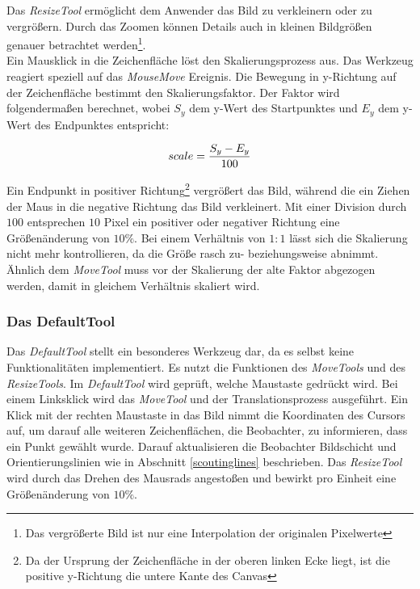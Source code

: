 Das \textit{ResizeTool} ermöglicht dem Anwender das Bild zu verkleinern oder zu vergrößern. Durch das Zoomen können Details auch in kleinen Bildgrößen genauer betrachtet werden\footnote{Das vergrößerte Bild ist nur eine Interpolation der originalen Pixelwerte}.\\
Ein Mausklick in die Zeichenfläche löst den Skalierungsprozess aus. Das Werkzeug reagiert speziell auf das \textit{MouseMove} Ereignis. Die Bewegung in y-Richtung auf der Zeichenfläche bestimmt den Skalierungsfaktor. Der Faktor wird folgendermaßen berechnet, wobei $S_y$ dem y-Wert des Startpunktes  und $E_y$ dem y-Wert des Endpunktes entspricht: 

\begin{equation}
scale = \frac{S_y - E_y}{100}
\vspace{0.5cm}
\end{equation}

Ein Endpunkt in positiver Richtung\footnote{Da der Ursprung der Zeichenfläche in der oberen linken Ecke liegt, ist die positive y-Richtung die untere Kante des Canvas} vergrößert das Bild, während die ein Ziehen der Maus in die negative Richtung das Bild verkleinert. Mit einer Division durch $100$ entsprechen $10$ Pixel ein positiver oder negativer Richtung eine Größenänderung von $10\%$. Bei einem Verhältnis von $1:1$ lässt sich die Skalierung nicht mehr kontrollieren, da die Größe rasch zu- beziehungsweise abnimmt.\\
Ähnlich dem \textit{MoveTool} muss vor der Skalierung der alte Faktor abgezogen werden, damit in gleichem Verhältnis skaliert wird.

\subsubsection{Das DefaultTool}

Das \textit{DefaultTool} stellt ein besonderes Werkzeug dar, da es selbst keine Funktionalitäten implementiert. Es nutzt die Funktionen des \textit{MoveTools} und des \textit{ResizeTools}. Im \textit{DefaultTool} wird geprüft, welche Maustaste gedrückt wird. Bei einem Linksklick wird das \textit{MoveTool} und der Translationsprozess ausgeführt. Ein Klick mit der rechten Maustaste in das Bild nimmt die Koordinaten des Cursors auf, um darauf alle weiteren Zeichenflächen, die Beobachter, zu informieren, dass ein Punkt gewählt wurde. Darauf aktualisieren die Beobachter Bildschicht und Orientierungslinien wie in Abschnitt \ref{scoutinglines} beschrieben. Das \textit{ResizeTool} wird durch das Drehen des Mausrads angestoßen und bewirkt pro Einheit eine Größenänderung von $10\%$.

